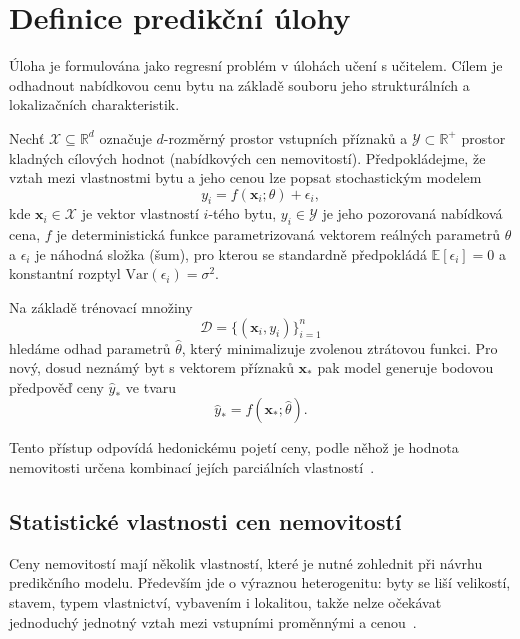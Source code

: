 \section{Definice predikční úlohy}
\label{sec:prediction_task}

Úloha je formulována jako regresní problém v úlohách učení s učitelem. Cílem je odhadnout nabídkovou cenu bytu na základě souboru jeho strukturálních a lokalizačních charakteristik.

Nechť $\mathcal{X} \subseteq \mathbb{R}^d$ označuje $d$-rozměrný prostor vstupních příznaků a $\mathcal{Y} \subset \mathbb{R}^+$ prostor kladných cílových hodnot (nabídkových cen nemovitostí). Předpokládejme, že vztah mezi vlastnostmi bytu a jeho cenou lze popsat stochastickým modelem
\begin{equation}
    y_i = f(\mathbf{x}_i; \theta) + \epsilon_i,
\end{equation}
kde $\mathbf{x}_i \in \mathcal{X}$ je vektor vlastností $i$-tého bytu, $y_i \in \mathcal{Y}$ je jeho pozorovaná nabídková cena, $f$ je deterministická funkce parametrizovaná vektorem reálných parametrů $\theta$ a $\epsilon_i$ je náhodná složka (šum), pro kterou se standardně předpokládá $\mathbb{E}[\epsilon_i] = 0$ a konstantní rozptyl $\text{Var}(\epsilon_i) = \sigma^2$.

Na základě trénovací množiny
\begin{equation}
    \mathcal{D} = \{(\mathbf{x}_i, y_i)\}_{i=1}^{n}
\end{equation}
hledáme odhad parametrů $\hat{\theta}$, který minimalizuje zvolenou ztrátovou funkci. Pro nový, dosud neznámý byt s vektorem příznaků $\mathbf{x}_*$ pak model generuje bodovou předpověď ceny $\hat{y}_*$ ve tvaru
\begin{equation}
    \hat{y}_* = f(\mathbf{x}_*; \hat{\theta}).
\end{equation}

Tento přístup odpovídá hedonickému pojetí ceny, podle něhož je hodnota nemovitosti určena kombinací jejích parciálních vlastností~\cite{Lancaster1966,Rosen1974}.


\subsection{Statistické vlastnosti cen nemovitostí}
\label{subsec:price_distribution}

Ceny nemovitostí mají několik vlastností, které je nutné zohlednit při návrhu predikčního modelu. Především jde o výraznou heterogenitu: byty se liší velikostí, stavem, typem vlastnictví, vybavením i lokalitou, takže nelze očekávat jednoduchý jednotný vztah mezi vstupními proměnnými a cenou~\cite{Lancaster1966,Rosen1974}.

